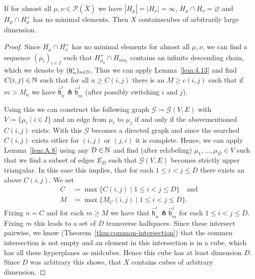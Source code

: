 \begin{prop}[{\cite[Proposition~4.10]{MR3509968}}]
  \label{prop:4.10}
  If for almost all \(\mu, \nu \in \mathcal{P}(\bar X)\) we have \(|H_\mu| = |H_\nu| = \infty\), \(H_\mu \cap H_\nu = \varnothing\) and \(H_\mu \cap H_\mu^+\) has no minimal elements. Then \(X\) containscubes of arbitrarily large dimension.
\end{prop}

\begin{proof}
  Since \(H_\mu \cap H_\nu^+\) has no minimal elements for almost all \(\mu, \nu\), we can find a sequence \((\mu_i)_{i \in I}\) such that \(H_{\mu_0}^+ \cap H_{mu_i}\) contains an infinite descending chain, which we denote by \((\mathfrak{h}^i_n)_{n \in \mathbb{N}}\). Thus we can apply Lemma~\ref{lem:4.13} and find \(C(i,j) \in \mathbb{N}\) such that for all \(n \geq C(i,j)\) there is an \(M \geq c(i,j)\) such that if \(m > M_n\) we have \(\mathfrak{\hat h}_n^i \pitchfork \mathfrak{\hat h}_m^j\) (after possibly switching \(i\) and \(j\)).

  Using this we can construct the following graph \(\mathcal{G} \coloneqq \mathcal{G}(V,E)\) with \(V \coloneqq \{\mu_i \mid i \in I\}\) and an edge from \(\mu_i\) to \(\mu_j\) if and only if the abovementioned \(C(i,j)\) exists. With this \(\mathcal{G}\) becomes a directed graph and since the searched \(C(i,j)\) exists either for \((i,j)\) or \((j,i)\) it is complete. Hence, we can apply Lemma~\ref{lem:A.8} using any \(D \in \mathbb{N}\) and find (after relabeling) \(\mu_1, \dots, \mu_D \in V\) such that we find a subset of edges \(E_D\) such that \(\mathcal{G}(V,E)\) becomes strictly upper triangular. In this case this implies, that for each \(1\leq i < j \leq D\) there exists an above \(C(i,j)\). We set
  \begin{align*}
    C &\coloneqq \max\{C(i,j) \mid 1 \leq i < j \leq D\} \quad \text{and}\\
    M &\coloneqq \max\{M_C(i,j) \mid 1 \leq i < j \leq D\}.
  \end{align*}
  Fixing \(n = C\) and for each \(m \geq M\) we have that \(\mathfrak{\hat h}_n^i \pitchfork \mathfrak{\hat h}_m^j\) for each \(1 \leq i < j \leq D\). Fixing \(m\) this leads to a set of \(D\) transverse halfspaces. Since these intersect pairwise, we know (Theorem~\ref{thm:common-intersection}) that the commen intersection is not empty and an element in this intersection is in a cube, which has all these hyperplanes as midcubes. Hence this cube has at least dimension \(D\). Since \(D\) was arbitrary this shows, that \(X\) contains cubes of arbitrary dimension.
\end{proof}

